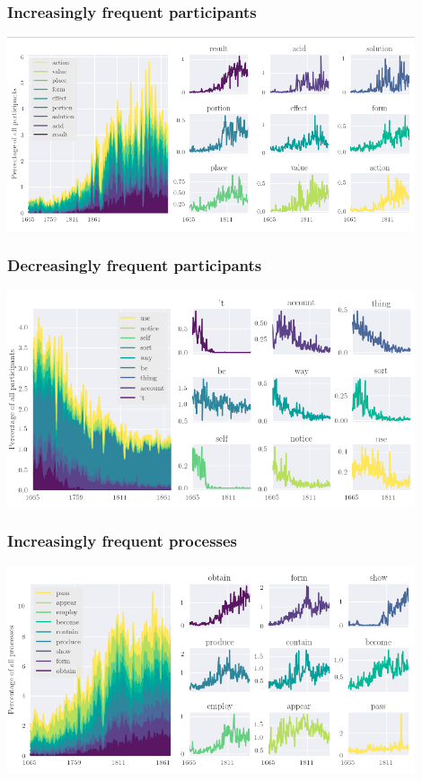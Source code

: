 \documentclass{beamer}       %
\begin{document}
\begin{frame}
    \frametitle{Increasingly frequent participants}
    \centering
    \includegraphics[width=0.90\textwidth]{../images/inc-part}
\end{frame}

\begin{frame}
    \frametitle{Decreasingly frequent participants}
    \centering
    \includegraphics[width=0.90\textwidth]{../images/dec-part}
\end{frame}

\begin{frame}
    \frametitle{Increasingly frequent processes}
    \centering
    \includegraphics[width=0.90\textwidth]{../images/inc-proc}
\end{frame}
\end{document}
